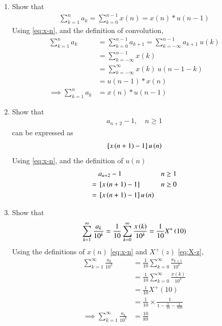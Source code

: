 \documentclass[journal,12pt,twocolumn]{IEEEtran}
\renewcommand\thesection{\arabic{section}}
\begin{document}
\begin{enumerate}[label=\thesection.\arabic*,ref=\thesection.\theenumi]


\item Show that
	\begin{align}
		\sum_{k=1}^{n}a_k = 
		\sum_{k=0}^{n-1}x(n) = x(n)*u(n-1)
	\end{align}
	\solution
	Using \eqref{eq:x-n}, and the definition of convolution,
	\begin{align*}
		\sum_{k=1}^{n}a_k &= \sum_{k=0}^{n-1}a_{k+1} = \sum_{k=-\infty}^{n-1}a_{k+1} \ u(k)\\
		&= \sum_{k=-\infty}^{n-1}x(k) \\ 
		&= \sum_{k=-\infty}^{\infty}x(k) \ u(n-1-k)\\
		&= u(n-1) * x(n) \\
		\implies \sum_{k=1}^{n}a_k &= x(n) * u(n-1)
	\end{align*}


\item Show that
	\begin{align}
		a_{n+2}-1, \quad n \ge 1
	\end{align}
	can be expressed as 
	\begin{align}
		{}\left[x\left(n+1\right)-1\right]u\left(n\right)
	\end{align}
	\solution
	Using \eqref{eq:x-n}, and the definition of $u(n)$
	\begin{align*}
		& \ a_{n+2} - 1 & n \ge 1 \\
		=& \ {}\left[x\left(n+1\right)-1\right] & n \ge 0 \\
		=& \ {}\left[x\left(n+1\right)-1\right]u\left(n\right)
	\end{align*}


\item Show that
	\begin{align}
		\sum_{k=1}^{\infty}\frac{a_k}{10^k}= 
		\frac{1}{10}\sum_{k=0}^{\infty}\frac{x\left(k\right)}{10^k} =\frac{1}{10}X^{+}\left({10}\right)
	\end{align}
	\solution Using the definitions of  $x(n)$ \eqref{eq:x-n} and $X^+(z)$ \eqref{eq:X-z},
	\begin{align}
		\sum_{k=1}^{\infty}\frac{a_k}{10^k} &= \frac{1}{10}\sum_{k = 0}^{\infty}\frac{a_{k+1}}{10^k} \nonumber \\
		&= \frac{1}{10}\sum_{k = 0}^{\infty}\frac{x(k)}{10^k} \nonumber \\
		&= \frac{1}{10}X^+(10) \nonumber \\
		&= \frac{1}{10}\times\frac{1}{1 - \frac{1}{10} - \frac{1}{100}} \nonumber \\
		\implies \sum_{k=1}^{\infty}\frac{a_k}{10^k} &= \frac{10}{89} \label{op:2}
	\end{align}



\end{enumerate}
\end{document}

